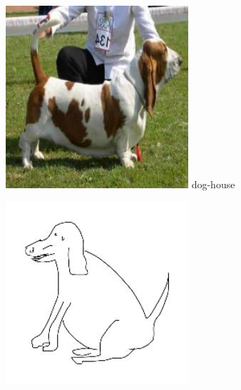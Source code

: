 \documentclass{article}
\begin{document}
\begin{center}
\begin{minipage}{0.142\textwidth}
        \includegraphics[width=\linewidth]{./pic/misclassified_r0_p5_2723.jpg}
        dog-house
    \end{minipage}%
    \begin{minipage}{0.142\textwidth}
        \includegraphics[width=\linewidth]{./pic/misclassified_r0_p6_1641.jpg}

\end{minipage}
\end{center}
\end{document}
